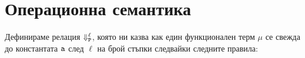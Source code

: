 \section{Операционна семантика}




Дефинираме релация $\Downarrow^{\ell}_{\texttt{P}}$, която ни казва как един функционален терм $\mu$
се свежда до константата $\texttt{a}$ след $\ell$ на брой стъпки следвайки следните правила:

